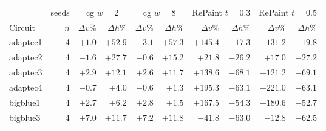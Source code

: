 \begin{tabular}{lr|rr|rr|rr|rr}
\toprule
& seeds & \multicolumn{2}{c|}{cg $w{=}2$} & \multicolumn{2}{c|}{cg $w{=}8$} & \multicolumn{2}{c|}{RePaint $t{=}0.3$} & \multicolumn{2}{c}{RePaint $t{=}0.5$} \\
Circuit & $n$ & $\Delta v$\% & $\Delta h$\% & $\Delta v$\% & $\Delta h$\% & $\Delta v$\% & $\Delta h$\% & $\Delta v$\% & $\Delta h$\% \\
\midrule
adaptec1 & 4 & $+1.0$ & $+52.9$ & $-3.1$ & $+57.3$ & $+145.4$ & $-17.3$ & $+131.2$ & $-19.8$ \\
adaptec2 & 4 & $-1.6$ & $+27.7$ & $-0.6$ & $+15.2$ & $+21.8$ & $-26.2$ & $+17.0$ & $-27.2$ \\
adaptec3 & 4 & $+2.9$ & $+12.1$ & $+2.6$ & $+11.7$ & $+138.6$ & $-68.1$ & $+121.2$ & $-69.1$ \\
adaptec4 & 4 & $-0.7$ & $+4.0$ & $-0.6$ & $+1.3$ & $+195.3$ & $-63.1$ & $+221.0$ & $-63.1$ \\
bigblue1 & 4 & $+2.7$ & $+6.2$ & $+2.8$ & $+1.5$ & $+167.5$ & $-54.3$ & $+180.6$ & $-52.7$ \\
bigblue3 & 4 & $+7.0$ & $+11.7$ & $+7.2$ & $+11.8$ & $-41.8$ & $-63.0$ & $-12.8$ & $-62.5$ \\
\bottomrule
\end{tabular}
